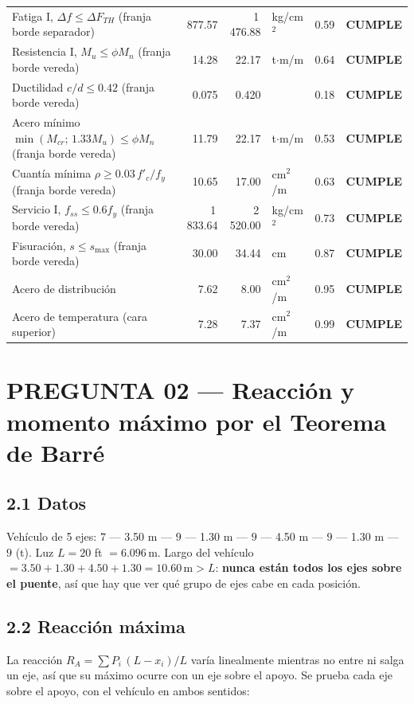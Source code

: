 \documentclass[11pt,a4paper]{article}
\newcommand{\uM}{\,\mathrm{m}}
\begin{document}
\begin{center}
\begin{tabular}{p{7.4cm}rrlrl}
Fatiga I, $\Delta f \le \Delta F_{TH}$ (franja borde separador) & 877.57 & 1\,476.88 & kg/cm$^2$ & 0.59 & \textcolor{ok}{\textbf{CUMPLE}} \\
Resistencia I, $M_u \le \phi M_n$ (franja borde vereda) & 14.28 & 22.17 & t$\cdot$m/m & 0.64 & \textcolor{ok}{\textbf{CUMPLE}} \\
Ductilidad $c/d \le 0.42$ (franja borde vereda) & 0.075 & 0.420 &  & 0.18 & \textcolor{ok}{\textbf{CUMPLE}} \\
Acero mínimo $\min(M_{cr};\,1.33M_u) \le \phi M_n$ (franja borde vereda) & 11.79 & 22.17 & t$\cdot$m/m & 0.53 & \textcolor{ok}{\textbf{CUMPLE}} \\
Cuantía mínima $\rho \ge 0.03\,f'_c/f_y$ (franja borde vereda) & 10.65 & 17.00 & cm$^2$/m & 0.63 & \textcolor{ok}{\textbf{CUMPLE}} \\
Servicio I, $f_{ss} \le 0.6 f_y$ (franja borde vereda) & 1\,833.64 & 2\,520.00 & kg/cm$^2$ & 0.73 & \textcolor{ok}{\textbf{CUMPLE}} \\
Fisuración, $s \le s_{\max}$ (franja borde vereda) & 30.00 & 34.44 & cm & 0.87 & \textcolor{ok}{\textbf{CUMPLE}} \\
Acero de distribución & 7.62 & 8.00 & cm$^2$/m & 0.95 & \textcolor{ok}{\textbf{CUMPLE}} \\
Acero de temperatura (cara superior) & 7.28 & 7.37 & cm$^2$/m & 0.99 & \textcolor{ok}{\textbf{CUMPLE}} \\
\bottomrule
\end{tabular}
\end{center}

\newpage
\section*{PREGUNTA 02 --- Reacción y momento máximo por el Teorema de Barré}

\subsection*{2.1 Datos}
Vehículo de 5 ejes: $7$ --- 3.50 m --- $9$ --- 1.30 m --- $9$ --- 4.50 m --- $9$ --- 1.30 m --- $9$ (t).
Luz $L = 20$ ft $= 6.096\uM$. Largo del vehículo $= 3.50 + 1.30 + 4.50 + 1.30 = 10.60\uM > L$:
\textbf{nunca están todos los ejes sobre el puente}, así que hay que ver qué grupo de ejes cabe en cada posición.

\subsection*{2.2 Reacción máxima}
La reacción $R_A = \sum P_i\,(L - x_i)/L$ varía linealmente mientras no entre ni salga un eje, así que su máximo
ocurre con un eje sobre el apoyo. Se prueba cada eje sobre el apoyo, con el vehículo en ambos sentidos:
\end{document}
